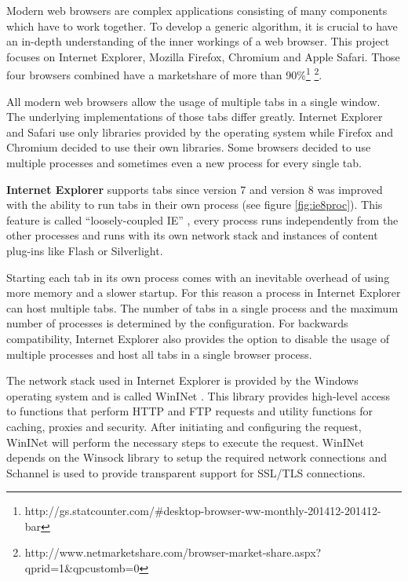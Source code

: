 
Modern web browsers are complex applications consisting of many components which have to work together. To develop a generic algorithm, it is crucial to have an in-depth understanding of the inner workings of a web browser. This project focuses on Internet Explorer, Mozilla Firefox, Chromium and Apple Safari. Those four browsers combined have a marketshare of more than 90\%\footnote{http://gs.statcounter.com/\#desktop-browser-ww-monthly-201412-201412-bar} \footnote{http://www.netmarketshare.com/browser-market-share.aspx?qprid=1\&qpcustomb=0}.

All modern web browsers allow the usage of multiple tabs in a single window. The underlying implementations of those tabs differ greatly. Internet Explorer and Safari use only libraries provided by the operating system while Firefox and Chromium decided to use their own libraries. Some browsers decided to use multiple processes and sometimes even a new process for every single tab.

\textbf{Internet Explorer} supports tabs since version 7 and version 8 was improved with the ability to run tabs in their own process (see figure \ref{fig:ie8proc}). This feature is called ``loosely-coupled IE'' \cite{IE8LCIE}, every process runs independently from the other processes and runs with its own network stack and instances of content plug-ins like Flash or Silverlight.

Starting each tab in its own process comes with an inevitable overhead of using more memory and a slower startup. For this reason a process in Internet Explorer can host multiple tabs. The number of tabs in a single process and the maximum number of processes is determined by the configuration. For backwards compatibility, Internet Explorer also provides the option to disable the usage of multiple processes and host all tabs in a single browser process.

\label{sec:brie}
The network stack used in Internet Explorer is provided by the Windows operating system and is called WinINet \cite{wininet}. This library provides high-level access to functions that perform HTTP and FTP requests and utility functions for caching, proxies and security. After initiating and configuring the request, WinINet will perform the necessary steps to execute the request. WinINet depends on the Winsock library \cite{winsock} to setup the required network connections and Schannel \cite{schannel} is used to provide transparent support for SSL/TLS connections.

